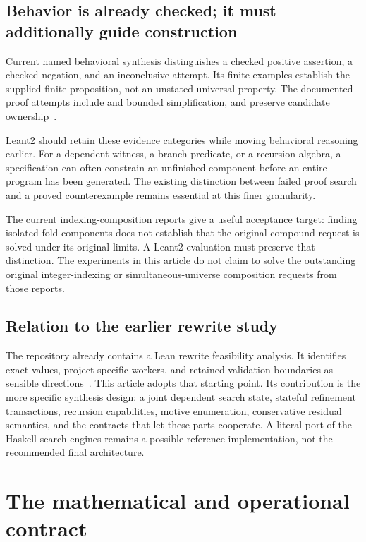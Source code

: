 \documentclass[11pt,letterpaper]{article}
\newcommand{\id}[1]{\texttt{\detokenize{#1}}}
\theoremstyle{definition}
\theoremstyle{remark}
\begin{document}
\subsection{Behavior is already checked; it must additionally guide construction}

Current named behavioral synthesis distinguishes a checked positive assertion, a checked negation, and an inconclusive attempt. Its finite examples establish the supplied finite proposition, not an unstated universal property. The documented proof attempts include \id{decide} and bounded simplification, and preserve candidate ownership~\cite{behavior}.

Leant2 should retain these evidence categories while moving behavioral reasoning earlier. For a dependent witness, a branch predicate, or a recursion algebra, a specification can often constrain an unfinished component before an entire program has been generated. The existing distinction between failed proof search and a proved counterexample remains essential at this finer granularity.

The current indexing-composition reports give a useful acceptance target: finding isolated fold components does not establish that the original compound request is solved under its original limits. A Leant2 evaluation must preserve that distinction. The experiments in this article do not claim to solve the outstanding original integer-indexing or simultaneous-universe composition requests from those reports.

\subsection{Relation to the earlier rewrite study}

The repository already contains a Lean rewrite feasibility analysis. It identifies exact \id{Expr} values, project-specific workers, and retained validation boundaries as sensible directions~\cite{rewrite}. This article adopts that starting point. Its contribution is the more specific synthesis design: a joint dependent search state, stateful refinement transactions, recursion capabilities, motive enumeration, conservative residual semantics, and the contracts that let these parts cooperate. A literal port of the Haskell search engines remains a possible reference implementation, not the recommended final architecture.

\section{The mathematical and operational contract}
\label{sec:contract}
\end{document}
